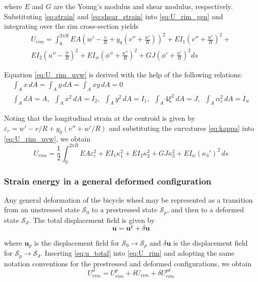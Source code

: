 \documentclass[\rootdir/thesis.tex]{subfiles}
\begin{document}
where $E$ and $G$ are the Young's modulus and shear modulus, respectively. Substituting \eqref{eq:strain} and \eqref{eq:shear_strain} into \eqref{eq:U_rim_gen} and integrating over the rim cross-section yields
\begin{multline}
\label{eq:U_rim_uvw}
U_{rim} = \int_0^{2\pi R}
	EA\left(w' - \frac{v}{R} + y_0\left(v'' + \frac{w'}{R}\right) \right)^2 +
	EI_1 \left(v'' + \frac{w'}{R}\right)^2 +\\
	EI_2 \left(u'' - \frac{\phi}{R}\right)^2 +
	EI_w\left(\phi'' + \frac{u''}{R}\right)^2 +
	GJ\left(\phi' + \frac{u'}{R}\right)^2 ds
\end{multline}

Equation \eqref{eq:U_rim_uvw} is derived with the help of the following relations:
\begin{gather}
\int_A x\, dA = \int_A y\, dA = \int_A xy\, dA = 0\\
\int_A dA = A,\,\,\, \int_A x^2\, dA = I_2,\,\,\, \int_A y^2\, dA = I_1,\,\,\,
\int_A 4\xi^2\, dA = J,\,\,\, \int_A \alpha_s^2\, dA = I_w
\end{gather}

Noting that the longitudinal strain at the centroid is given by $\varepsilon_c = w' - v/R + y_0(v'' + w'/R)$ and substituting the curvatures \eqref{eq:kappa} into \eqref{eq:U_rim_uvw}, we obtain
\begin{equation}
\label{eq:U_rim}
U_{rim} = \frac{1}{2}\int_0^{2\pi R} EA\varepsilon_c^2 + EI_1\kappa_1^2 + EI_2\kappa_2^2 + GJ\kappa_3^2 + EI_w(\kappa_3')^2\, ds
\end{equation}

\subsubsection{Strain energy in a general deformed configuration}

Any general deformation of the bicycle wheel may be represented as a transition from an unstressed state $\mathcal{S}_0$ to a prestressed state $\mathcal{S}_p$, and then to a deformed state $\mathcal{S}_d$. The total displacement field is given by
\begin{equation}
\label{eq:u_total}
\mathbf{u} = \mathbf{u}^p + \delta \mathbf{u}
\end{equation}

where $\mathbf{u}_p$ is the displacement field for $\mathcal{S}_0 \rightarrow \mathcal{S}_p$ and $\delta\mathbf{u}$ is the displacement field for $\mathcal{S}_p \rightarrow \mathcal{S}_d$. Inserting \eqref{eq:u_total} into \eqref{eq:U_rim} and adopting the same notation conventions for the prestressed and deformed configurations, we obtain
\begin{equation}
U_{rim}^d = U_{rim}^p + \delta U_{rim} + \delta U_{rim}^{p\delta}
\end{equation}
\end{document}
